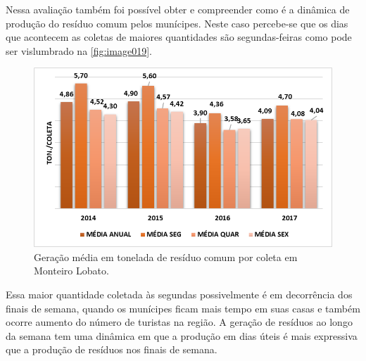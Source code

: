 Nessa avaliação também foi possível obter e compreender como é a dinâmica de produção do resíduo comum pelos munícipes. Neste caso percebe-se que os dias que acontecem as coletas de maiores quantidades são segundas-feiras como pode ser vislumbrado na \autoref{fig:image019}.

\begin{figure}
	\centering
	\includegraphics[width=0.7\linewidth]{produtos/prodtres/image019}
	\caption{Geração média em tonelada de resíduo comum por coleta em Monteiro Lobato.}
	\label{fig:image019}
\end{figure}

Essa maior quantidade coletada às segundas possivelmente é em decorrência dos finais de semana, quando os munícipes ficam mais tempo em suas casas e também ocorre aumento do número de turistas na região. A geração de resíduos ao longo da semana tem uma dinâmica em que a produção em dias úteis é mais expressiva que a produção de resíduos nos finais de semana.

